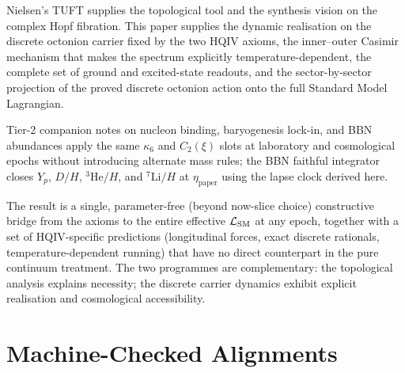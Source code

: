 \documentclass[11pt]{amsart}
\begin{document}
Nielsen's TUFT supplies the topological tool and the synthesis vision on the complex Hopf fibration. This paper supplies the dynamic realisation on the discrete octonion carrier fixed by the two HQIV axioms, the inner--outer Casimir mechanism that makes the spectrum explicitly temperature-dependent, the complete set of ground and excited-state readouts, and the sector-by-sector projection of the proved discrete octonion action onto the full Standard Model Lagrangian.

Tier-2 companion notes on nucleon binding, baryogenesis lock-in, and BBN abundances \cite{hqiv-nucleon-binding-paper,hqiv-baryogenesis-paper,hqiv-bbn-paper} apply the same $\kappa_6$ and $C_2(\xi)$ slots at laboratory and cosmological epochs without introducing alternate mass rules; the BBN faithful integrator closes $Y_p$, $D/H$, $^3\mathrm{He}/H$, and $^7\mathrm{Li}/H$ at $\eta_{\mathrm{paper}}$ using the lapse clock derived here.

The result is a single, parameter-free (beyond now-slice choice) constructive bridge from the axioms to the entire effective $\mathcal{L}_{\rm SM}$ at any epoch, together with a set of HQIV-specific predictions (longitudinal forces, exact discrete rationals, temperature-dependent running) that have no direct counterpart in the pure continuum treatment. The two programmes are complementary: the topological analysis explains necessity; the discrete carrier dynamics exhibit explicit realisation and cosmological accessibility.

\section{Machine-Checked Alignments}
\end{document}
